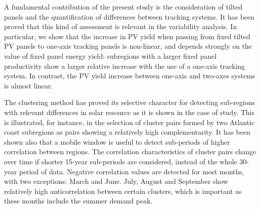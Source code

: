 A fundamental contribution of the present study is the consideration of tilted panels and the quantification of differences between tracking systems. It has been proved that this kind of assessment is relevant in the variability analysis. In particular, we show that the increase in PV yield when passing from fixed tilted PV panels to one-axis tracking panels is non-linear, and depends strongly on the value of fixed panel energy yield: subregions with a larger fixed panel productivity show a larger relative increase with the use of a one-axis tracking system. In contrast, the PV yield increase between one-axis and two-axes systems is almost linear.


The clustering method has proved its selective character for detecting sub-regions with relevant differences in solar resource as it is shown in the case of study. This is illustrated, for instance, in the selection of cluster pairs formed by two Atlantic coast subregions as pairs showing a relatively high complementarity. It has been shown also that a mobile window is useful to detect sub-periods of higher correlation between regions. The correlation characteristics of cluster pairs change over time if shorter 15-year sub-periods are considered, instead of the whole 30-year period of data. Negative correlation values are detected for most months, with two exceptions: March and June. July, August and September show relatively high anticorrelation between certain clusters, which is important as these months include the summer demand peak. 

